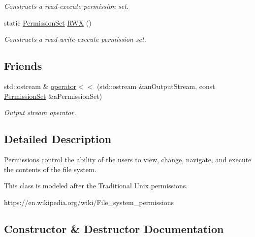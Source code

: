 \begin{DoxyCompactItemize}
\begin{DoxyCompactList}\small\item\em Constructs a read-\/execute permission set. \end{DoxyCompactList}\item 
static \hyperlink{classlibrary_1_1core_1_1fs_1_1_permission_set}{Permission\+Set} \hyperlink{classlibrary_1_1core_1_1fs_1_1_permission_set_afa3f9d07a7053240ae97c587543cdb00}{R\+WX} ()
\begin{DoxyCompactList}\small\item\em Constructs a read-\/write-\/execute permission set. \end{DoxyCompactList}\end{DoxyCompactItemize}
\subsection*{Friends}
\begin{DoxyCompactItemize}
\item 
std\+::ostream \& \hyperlink{classlibrary_1_1core_1_1fs_1_1_permission_set_a8f2d68bb94d86dea76869abe148ea9f3}{operator$<$$<$} (std\+::ostream \&an\+Output\+Stream, const \hyperlink{classlibrary_1_1core_1_1fs_1_1_permission_set}{Permission\+Set} \&a\+Permission\+Set)
\begin{DoxyCompactList}\small\item\em Output stream operator. \end{DoxyCompactList}\end{DoxyCompactItemize}


\subsection{Detailed Description}
Permissions control the ability of the users to view, change, navigate, and execute the contents of the file system. 

This class is modeled after the Traditional Unix permissions.

https\+://en.wikipedia.\+org/wiki/\+File\+\_\+system\+\_\+permissions 

\subsection{Constructor \& Destructor Documentation}
\mbox{\label{classlibrary_1_1core_1_1fs_1_1_permission_set_a39ee30a6f35f325c1cd7bcd307ab11aa}} 

